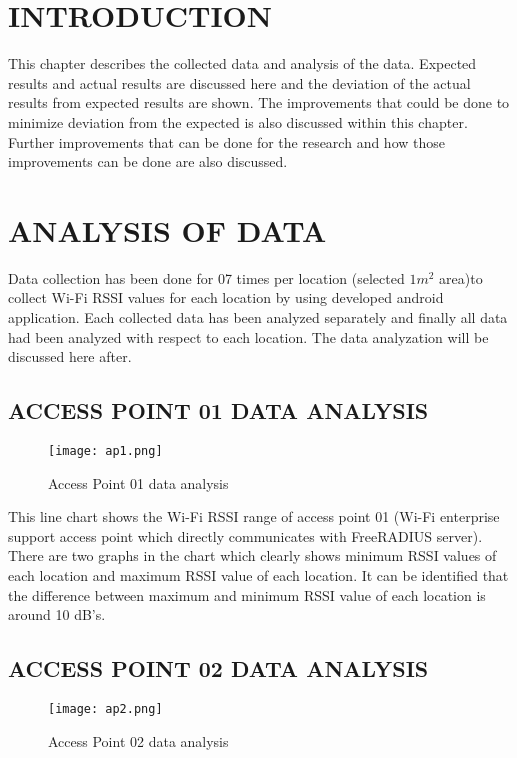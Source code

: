 \section{INTRODUCTION}
This chapter describes the collected data and analysis of the data. Expected results and actual results are discussed here and the deviation of the actual results from expected results are shown. The improvements that could be done  to minimize deviation from the expected is also discussed within this chapter. Further improvements that can be done for the research and how those improvements can be done are also discussed.

\section{ANALYSIS OF DATA}
Data collection has been done for 07 times per location (selected $1m^2$ area)to collect Wi-Fi RSSI values for each location by using developed android application. Each collected data has been analyzed separately and finally all data had been analyzed with respect to each location. The data analyzation will be discussed here after.

\newpage
\subsection{ACCESS POINT 01 DATA ANALYSIS}  
\begin{center}
	\begin{figure*}[h]	
		\centering
		\texttt{[image: ap1.png]}
		\caption{Access Point 01 data analysis}
	\end{figure*}
\end{center} 

This line chart shows the Wi-Fi RSSI range of access point 01 (Wi-Fi enterprise support access point which directly communicates with FreeRADIUS server). There are two graphs in the chart which clearly shows minimum RSSI values of each location and maximum RSSI value of each location. It can be identified that the difference between maximum and minimum RSSI value of each location is around 10 dB's.

\newpage
\subsection{ACCESS POINT 02 DATA ANALYSIS}  
\begin{center}
	\begin{figure*}[h]	
		\centering
		\texttt{[image: ap2.png]}
		\caption{Access Point 02 data analysis}
	\end{figure*}
\end{center} 

